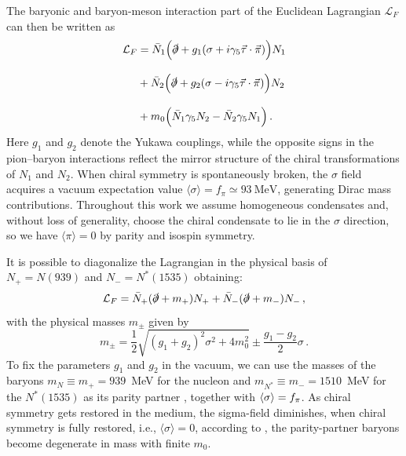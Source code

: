 \documentclass[aps,twocolumn,prd,superscriptaddress,nofootinbib,floatfix]{revtex4-2}
\begin{document}
The baryonic and baryon-meson interaction part of the Euclidean Lagrangian $\mathcal{L}_F$ can then be written as
\begin{equation}\label{eq:L_f}
\begin{split}
\mathcal{L}_F &=\bar{N}_1\Big(\slashed\partial + g_1(\sigma + i\gamma_5 \vec\tau \cdot \vec\pi)\Big)N_1 \\[2ex]
&+ \bar{N}_2\Big(\slashed\partial + g_2(\sigma - i\gamma_5 \vec\tau \cdot \vec\pi)\Big)N_2 \\[2ex]
&+ m_0 \Big(\bar{N}_1 \gamma_5 N_2 - \bar{N}_2 \gamma_5 N_1\Big)\,.
\end{split}
\end{equation}
Here $g_1$ and $g_2$ denote the Yukawa couplings, while the opposite signs in the pion–baryon interactions reflect the mirror structure of the chiral transformations of $N_1$ and $N_2$. When chiral symmetry is spontaneously broken, the $\sigma$ field acquires a vacuum expectation value $\langle \sigma \rangle = f_\pi \simeq 93 \ \mathrm{MeV}$, generating Dirac mass contributions. Throughout this work we assume homogeneous condensates and, without loss of generality, choose the chiral condensate to lie in the $\sigma$ direction, so we have $\langle\pi\rangle=0$ by parity and isospin symmetry.

It is possible to diagonalize the Lagrangian in the physical basis of $N_+=N(939)$ and $N_-=N^*(1535)$ obtaining:
\begin{equation}
\label{eq:free_fermions}
\mathcal{L}_F =\bar{N}_+(\slashed\partial + m_+)N_+
+ \bar{N}_-(\slashed\partial + m_-)N_-  \,,
\end{equation}
with the physical masses $m_\pm$ given by 
\begin{equation}
\label{eq:masses}
m_\pm =\frac{1}{2} \sqrt{(g_1+g_2)^2\sigma^2 + 4m_0^2} \pm \frac{g_1-g_2}{2}\sigma \, .
\end{equation}
To fix the parameters $g_1$ and $g_2$ in the vacuum, we can use the masses of the baryons $m_N\equiv m_+=939$~MeV for the nucleon and $m_{N^*}\equiv m_-=1510$~MeV for the $N^*(1535)$ as its parity partner \cite{ParticleDataGroup:2024cfk}, together with $\expval{\sigma} = f_\pi$. As chiral symmetry gets restored in the medium, the sigma-field diminishes, when chiral symmetry is fully restored, i.e., $\langle\sigma\rangle=0$, according to , the parity-partner baryons become degenerate in mass with finite $m_0$. 
\end{document}
